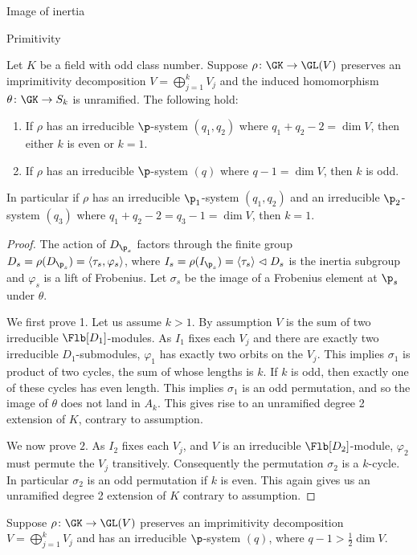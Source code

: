 \documentclass[11pt,a4paper]{article}
\begin{document}
\begin{section}{Image of inertia}
\begin{subsection}{Primitivity}
\begin{proposition}
\label{prop_primitivity_odd_class_number}
Let $K$ be a field with odd class number.
Suppose $\rho\colon \GK \rightarrow \GL(V)$ preserves an imprimitivity decomposition $V=\bigoplus^{k}_{j=1}V_j$ and the induced homomorphism $\theta\colon \GK \rightarrow S_k$ is unramified.
The following hold:
\begin{enumerate}
    \item If $\rho$ has an irreducible $\p$-system $(q_1,q_2)$ where $q_1+q_2-2 = \dim V$, then either $k$ is even or $k=1$.
    \item If $\rho$ has an irreducible $\p$-system $(q)$ where $q-1 = \dim V$, then $k$ is odd.
\end{enumerate}
In particular if $\rho$  has an irreducible $\p_1$-system $(q_1,q_2)$ and an irreducible $\p_2$-system $(q_3)$ where $q_1+q_2- 2 = q_3-1= \dim V$, then $k=1$.
\end{proposition}%

\begin{proof}
The action of $D_{\p_s}$ factors through the finite group $D_s = \rho(D_{\p_s}) = \langle \tau_s , \varphi_s \rangle$, where $I_s = \rho(I_{\p_s}) = \langle \tau_s \rangle \vartriangleleft D_s$ is the inertia subgroup and $\varphi_s$ is a lift of Frobenius.
Let $\sigma_s$ be the image of a Frobenius element at $\p_s$ under $\theta$.


We first prove 1. Let us assume $k>1$.
By assumption $V$ is the sum of two irreducible $\Flb[D_{1}]$-modules. As $I_1$ fixes each $V_j$ and there are exactly two irreducible $D_1$-submodules, $\varphi_1$ has exactly two orbits on the $V_j$. This implies $\sigma_1$ is product of two cycles, the sum of whose lengths is $k$.
If $k$ is odd, then exactly one of these cycles has even length. This implies $\sigma_1$ is an odd permutation, and so the image of $\theta$ does not land in $A_k$. This gives rise to an unramified degree 2 extension of $K$, contrary to assumption.

We now prove $2$.
 As $I_2$ fixes each $V_j$, and $V$ is an irreducible $\Flb[D_{2}]$-module, $\varphi_2$ must permute the $V_j$ transitively.
Consequently the permutation $\sigma_2$ is a $k$-cycle. 
In particular $\sigma_2$ is an odd permutation if $k$ is even.
This again gives us an unramified degree 2 extension of $K$ contrary to assumption.
\end{proof}

\begin{lemma}
\label{lemma_primitivity_unramified_case}
Suppose $\rho\colon \GK \rightarrow \GL(V)$ preserves an imprimitivity decomposition $V=\bigoplus^{k}_{j=1}V_j$ and has an irreducible $\p$-system $(q)$, where $q-1> \frac{1}{2}\dim V$.


\end{lemma}
\end{subsection}
\end{section}
\end{document}
